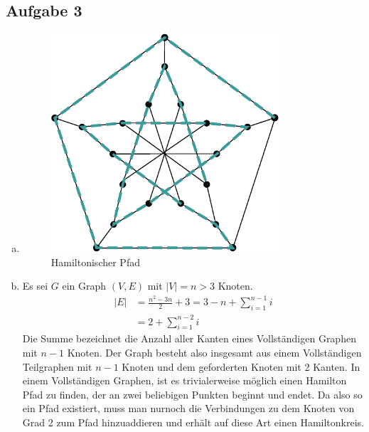 \documentclass[11pt]{article}
\newcommand{\abs}[1]{\left| #1 \right| }
\begin{document}
\subsection*{Aufgabe 3}
\begin{enumerate}[a)]
  \item 
    \begin{figure}[h!]
      \centering
      \includegraphics[width=0.8\textwidth]{hamilton_graph}
      \caption{Hamiltonischer Pfad}
      \label{fig:hamilton_graph.eps}
    \end{figure}
  \item
    Es sei $G$ ein Graph $(V, E)$ mit $\abs{V} = n>3$ Knoten.
    \begin{align*}
      |E| & =\frac{n^2 - 3n}{2} + 3 = 3 - n + \sum_{i=1}^{n-1} i \\
          & = 2  + \sum_{i=1}^{n-2} i
    \end{align*}
    Die Summe bezeichnet die Anzahl aller Kanten eines Vollst\"andigen 
    Graphen mit $n-1$ Knoten. Der Graph besteht also insgesamt aus einem 
    Vollst\"andigen Teilgraphen mit $n-1$ Knoten und dem geforderten Knoten
    mit 2 Kanten. In einem Vollst\"andigen Graphen, ist es trivialerweise
    m\"oglich einen Hamilton Pfad zu finden, der an zwei beliebigen 
    Punkten beginnt und endet. Da also so ein Pfad existiert, muss man
    nurnoch die Verbindungen zu dem Knoten von Grad 2 zum Pfad hinzuaddieren
    und erh\"alt auf diese Art einen Hamiltonkreis.

\end{enumerate} 
\end{document}

